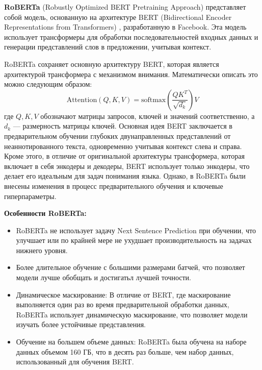 \textbf{RoBERTa} (Robustly Optimized BERT Pretraining Approach) \cite{liu2019roberta} представляет собой модель, основанную на архитектуре BERT (Bidirectional Encoder Representations from Transformers) \cite{devlin2019bert}, разработанную в Facebook. Эта модель использует трансформеры для обработки последовательностей входных данных и генерации представлений слов в предложении, учитывая контекст.

\newline
RoBERTa сохраняет основную архитектуру BERT, которая является архитектурой трансформера с механизмом внимания. Математически описать это можно следующим образом:
\begin{equation}
\text{Attention}(Q, K, V) = \text{softmax}\left(\frac{QK^T}{\sqrt{d_k}}\right)V
\end{equation}
где \( Q, K, V \) обозначают матрицы запросов, ключей и значений соответственно, а \( d_k \) — размерность матрицы ключей.
\newline Основная идея BERT заключается в предварительном обучении глубоких двунаправленных представлений от неаннотированного текста, одновременно учитывая контекст слева и справа. Кроме этого, в отличие от оригинальной архитектуры трансформера, которая включает в себя энкодеры и декодеры, BERT использует только энкодеры, что делает его идеальным для задач понимания языка. Однако, в RoBERTa были внесены изменения в процесс предварительного обучения и ключевые гиперпараметры.

\newline
\textbf{Особенности RoBERTa:}
\begin{itemize}
\item RoBERTa не использует задачу Next Sentence Prediction при обучении, что улучшает или по крайней мере не ухудшает производительность на задачах нижнего уровня.
\item Более длительное обучение с большими размерами батчей, что позволяет модели лучше обобщать и достигатьл лучшей точности.
\item Динамическое маскирование: В отличие от BERT, где маскирование выполняется один раз во время предварительной обработки данных, RoBERTa использует динамическую маскирование, что позволяет модели изучать более устойчивые представления.
\item Обучение на большем объеме данных: RoBERTa была обучена на наборе данных объемом 160 ГБ, что в десять раз больше, чем набор данных, использованный для обучения BERT.
\end{itemize}

